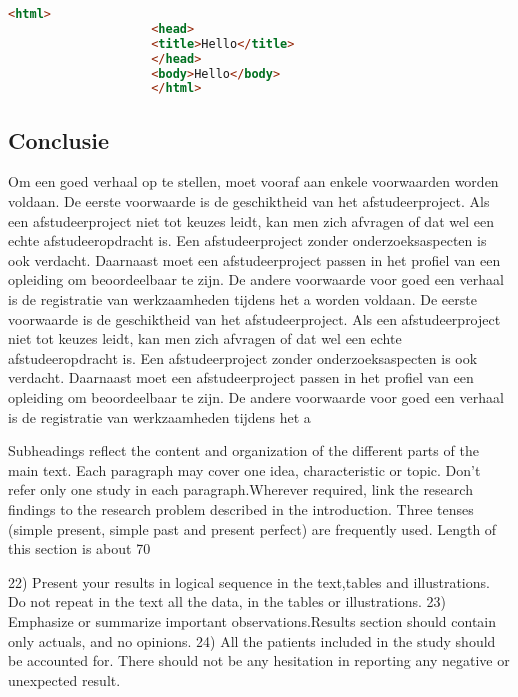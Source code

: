 			\begin{Aanpassen}
				\begin{lstlisting}[language=html]
					<html>
					<head>
					<title>Hello</title>
					</head>
					<body>Hello</body>
					</html>
				\end{lstlisting}
			\end{Aanpassen}
			
			\subsection{Conclusie}
			
			
			
			Om een goed verhaal op te stellen, moet vooraf aan enkele voorwaarden
			worden voldaan. De eerste voorwaarde is de geschiktheid van het
			afstudeerproject. Als een afstudeerproject niet tot keuzes leidt, kan
			men zich afvragen of dat wel een echte afstudeeropdracht is. Een
			afstudeerproject zonder onderzoeksaspecten is ook verdacht. Daarnaast
			moet een afstudeerproject passen in het profiel van een opleiding om
			beoordeelbaar te zijn. De andere voorwaarde voor goed een verhaal is
			de registratie van werkzaamheden tijdens het a
			worden voldaan. De eerste voorwaarde is de geschiktheid van het
			afstudeerproject. Als een afstudeerproject niet tot keuzes leidt, kan
			men zich afvragen of dat wel een echte afstudeeropdracht is. Een
			afstudeerproject zonder onderzoeksaspecten is ook verdacht. Daarnaast
			moet een afstudeerproject passen in het profiel van een opleiding om
			beoordeelbaar te zijn. De andere voorwaarde voor goed een verhaal is
			de registratie van werkzaamheden tijdens het a
			
			
			Subheadings reflect the content and organization of the different parts of the main text. Each paragraph may cover one idea, characteristic or topic. Don’t refer only one study in each paragraph.Wherever required, link the research findings to the research problem described in the introduction. Three tenses (simple present, simple past and present perfect) are frequently used. Length of this section is about 70%
			
			
			22)   Present your results in logical sequence  in the text,tables and illustrations.  Do not repeat in the text all the data, in the tables or illustrations.
			23)   Emphasize or summarize important observations.Results  section should contain only  actuals, and no opinions.
			24)   All  the  patients  included  in  the  study  should  be accounted for. There should not be any hesitation in reporting any negative or unexpected result.
			
